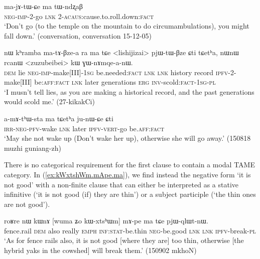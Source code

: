 \begin{exe}
\ex \label{ex:ma.tWndzxaB}
\gll  ma-jɤ-tɯ-ɕe ma tɯ-ndʐaβ \\
\textsc{neg}-\textsc{imp}-2-go \textsc{lnk} 2-\textsc{acaus}:cause.to.roll.down:\textsc{fact} \\
\glt `Don't go (to the temple on the mountain to do circumambulations), you might fall down.' (conversation, conversation 15-12-05)
\end{exe}

\begin{exe}
\ex \label{ex:matABzea}
\gll nɯ kʰramba ma-tɤ-βze-a ra ma tɕe <lishijizai> pjɯ-tɯ-βze ɕti tɕetʰa, nɯnɯ rcanɯ <zuzubeibei> kɯ ɣɯ-nɤmqe-a-nɯ.  \\
\textsc{dem}  lie \textsc{neg}-\textsc{imp}-make[III]-\textsc{1sg} be.needed:\textsc{fact} \textsc{lnk} \textsc{lnk}   history record \textsc{ipfv}-2-make[III] be:\textsc{aff}:\textsc{fact} \textsc{lnk} later generations \textsc{erg}  \textsc{inv}-scold:\textsc{fact}-\textsc{1sg}-\textsc{pl} \\
\glt `I musn't tell lies, as you are making a historical record, and the past generations would scold me.'  (27-kikakCi)
 \end{exe}

\begin{exe}
\ex \label{ex:ma.tCetha.junWCe}
\gll a-mɤ-tʰɯ-sta ma tɕetʰa ju-nɯ-ɕe ɕti \\
\textsc{irr}-\textsc{neg}-\textsc{pfv}-wake \textsc{lnk} later \textsc{ipfv}-\textsc{vert}-go be.\textsc{aff}:\textsc{fact} \\
\glt `May she not wake up (Don't wake her up), otherwise she will go away.' (150818 muzhi guniang-zh)
\end{exe}  

There is no categorical requirement for the first clause to contain a modal TAME category. In (\ref{ex:kWxtshWm.mApe.ma}), we find instead the negative form  `it is not good' with a non-finite clause that can either be interpreted as a stative infinitive (`it is not good (if) they are thin') or a subject participle (`the thin ones are not good').

\begin{exe}
\ex \label{ex:kWxtshWm.mApe.ma}
\gll roʁre nɯ kɯnɤ [wuma ʑo kɯ-xtsʰɯm] mɤ-pe ma tɕe pjɯ-qlɯt-nɯ. \\
fence.rail \textsc{dem} also really \textsc{emph} \textsc{inf}:\textsc{stat}-be.thin \textsc{neg}-be.good \textsc{lnk} \textsc{lnk} \textsc{ipfv}-break-\textsc{pl} \\
\glt `As for fence rails also, it is not good [where they are] too thin, otherwise [the hybrid yaks in the cowshed] will break them.' (150902 mkhoN)
\end{exe}  

